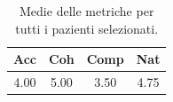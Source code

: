 
\begin{table}[!h]
\centering
\begin{tabular}{||c c c c||}
\hline
Acc & Coh & Comp & Nat \\ [0.5ex]
\hline\hline
4.00 & 5.00 & 3.50 & 4.75 \\
\hline
\end{tabular}
\caption{Medie delle metriche per tutti i pazienti selezionati.}
\label{tab:metriche_finali_pazienti}
\end{table}
